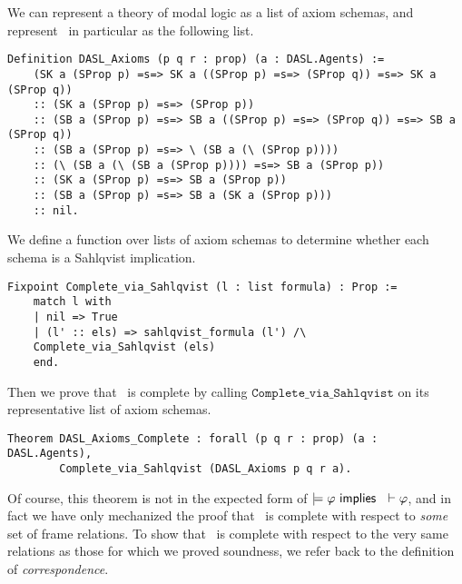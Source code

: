 We can represent a theory of modal logic as a list of axiom schemas, and represent \DASL\ in particular as the following list.

\begin{tcolorbox}
		\begin{lstlisting}[language=Coq]
	Definition DASL_Axioms (p q r : prop) (a : DASL.Agents) := 
	(SK a (SProp p) =s=> SK a ((SProp p) =s=> (SProp q)) =s=> SK a (SProp q))
	:: (SK a (SProp p) =s=> (SProp p))
	:: (SB a (SProp p) =s=> SB a ((SProp p) =s=> (SProp q)) =s=> SB a (SProp q))
	:: (SB a (SProp p) =s=> \ (SB a (\ (SProp p))))
	:: (\ (SB a (\ (SB a (SProp p)))) =s=> SB a (SProp p))
	:: (SK a (SProp p) =s=> SB a (SProp p))
	:: (SB a (SProp p) =s=> SB a (SK a (SProp p)))
	:: nil.
	\end{lstlisting}
\end{tcolorbox}

We define a function over lists of axiom schemas to determine whether each schema is a Sahlqvist implication.

\begin{tcolorbox}
	\begin{lstlisting}[language=Coq]
	Fixpoint Complete_via_Sahlqvist (l : list formula) : Prop :=  
	match l with
	| nil => True
	| (l' :: els) => sahlqvist_formula (l') /\ 
	Complete_via_Sahlqvist (els)
	end.
	\end{lstlisting}
\end{tcolorbox}

Then we prove that \DASL\ is complete by calling $\mathtt{Complete\_via\_Sahlqvist}$ on its representative list of axiom schemas.

\begin{tcolorbox}
	\begin{lstlisting}[language=Coq]
Theorem DASL_Axioms_Complete : forall (p q r : prop) (a : DASL.Agents),
		Complete_via_Sahlqvist (DASL_Axioms p q r a).
	\end{lstlisting}
\end{tcolorbox}

Of course, this theorem is not in the expected form of $\models \varphi \textsf{\ implies \ } \vdash \varphi$, and in fact we have only mechanized the proof that \DASL\ is complete with respect to \emph{some} set of frame relations. To show that \DASL\ is complete with respect to the very same relations as those for which we proved soundness, we refer back to the definition of \emph{correspondence}. 


